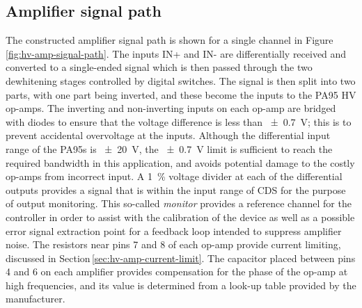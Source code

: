 \subsection{Amplifier signal path}
The constructed amplifier signal path is shown for a single channel in Figure\,\ref{fig:hv-amp-signal-path}. The inputs IN+ and IN- are differentially received and converted to a single-ended signal which is then passed through the two dewhitening stages controlled by digital switches. The signal is then split into two parts, with one part being inverted, and these become the inputs to the PA95 \gls{HV} op-amps. The inverting and non-inverting inputs on each op-amp are bridged with diodes to ensure that the voltage difference is less than \SI{\pm0.7}{\volt}; this is to prevent accidental overvoltage at the inputs. Although the differential input range of the PA95s is \SI{\pm20}{\volt}, the \SI{\pm0.7}{\volt} limit is sufficient to reach the required bandwidth in this application, and avoids potential damage to the costly op-amps from incorrect input. A \SI{1}{\percent} voltage divider at each of the differential outputs provides a signal that is within the input range of \gls{CDS} for the purpose of output monitoring. This so-called \emph{monitor} provides a reference channel for the controller in order to assist with the calibration of the device as well as a possible error signal extraction point for a feedback loop intended to suppress amplifier noise. The resistors near pins 7 and 8 of each op-amp provide current limiting, discussed in Section\,\ref{sec:hv-amp-current-limit}. The capacitor placed between pins 4 and 6 on each amplifier provides compensation for the phase of the op-amp at high frequencies, and its value is determined from a look-up table provided by the manufacturer.

